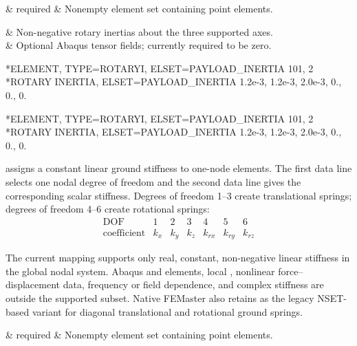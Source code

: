 \begin{keywordparameters}
 & required & Nonempty element set containing  point elements. \\
\end{keywordparameters}

\begin{keyworddata}
 & Non-negative rotary inertias about the three supported axes. \\
 & Optional Abaqus tensor fields; currently required to be zero. \\
\end{keyworddata}

\exampleheading
\begin{dialectexamples}
\begin{femasterdeck}
*ELEMENT, TYPE=ROTARYI, ELSET=PAYLOAD_INERTIA
101, 2
*ROTARY INERTIA, ELSET=PAYLOAD_INERTIA
1.2e-3, 1.2e-3, 2.0e-3, 0., 0., 0.
\end{femasterdeck}
\begin{abaqusdeck}
*ELEMENT, TYPE=ROTARYI, ELSET=PAYLOAD_INERTIA
101, 2
*ROTARY INERTIA, ELSET=PAYLOAD_INERTIA
1.2e-3, 1.2e-3, 2.0e-3, 0., 0., 0.
\end{abaqusdeck}
\end{dialectexamples}


 assigns a constant linear ground stiffness to one-node  elements. The first data line selects one nodal degree of freedom and the second data line gives the corresponding scalar stiffness. Degrees of freedom 1--3 create translational springs; degrees of freedom 4--6 create rotational springs:
\[
\begin{array}{c|cccccc}
\text{DOF} & 1 & 2 & 3 & 4 & 5 & 6 \\
\hline
\text{coefficient} & k_x & k_y & k_z & k_{rx} & k_{ry} & k_{rz}
\end{array}
\]

The current mapping supports only real, constant, non-negative linear stiffness in the global nodal system. Abaqus  and  elements, local , nonlinear force--displacement data, frequency or field dependence, and complex stiffness are outside the supported subset. Native FEMaster also retains  as the legacy NSET-based variant for diagonal translational and rotational ground springs.

\begin{keywordparameters}
 & required & Nonempty element set containing  point elements. \\
\end{keywordparameters}

